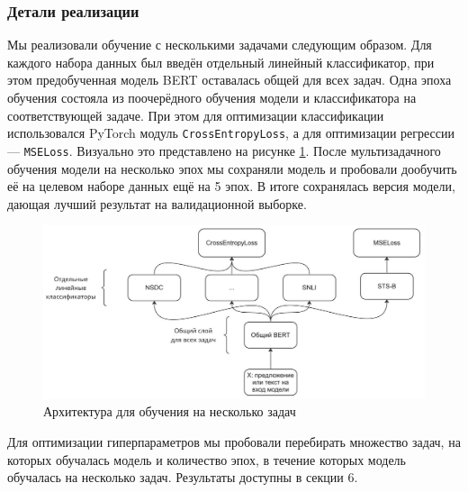 \documentclass[a4paper,14pt]{extarticle}
\begin{document}
    \subsubsection{Детали реализации}
    Мы реализовали обучение с несколькими задачами следующим образом. Для каждого набора данных был введён отдельный линейный классификатор, при этом предобученная модель BERT оставалась общей для всех задач. Одна эпоха обучения состояла из поочерёдного обучения модели и классификатора на соответствующей задаче. При этом для оптимизации классификации использовался PyTorch модуль \texttt{CrossEntropyLoss}, а для оптимизации регрессии --- \texttt{MSELoss}. Визуально это представлено на рисунке \ref{fig:multi-task-learning-architecture}. После мультизадачного обучения модели на несколько эпох мы сохраняли модель и пробовали дообучить её на целевом наборе данных ещё на 5 эпох. В итоге сохранялась версия модели, дающая лучший результат на валидационной выборке.
    \begin{figure}[h!]
        \centering
        \includegraphics*[width=\linewidth]{multi-task-learning-architecture.jpg}
        \caption{Архитектура для обучения на несколько задач}
        \label{fig:multi-task-learning-architecture}
    \end{figure}
    
    Для оптимизации гиперпараметров мы пробовали перебирать множество задач, на которых обучалась модель и количество эпох, в течение которых модель обучалась на несколько задач. Результаты доступны в секции 6.
\end{document}
